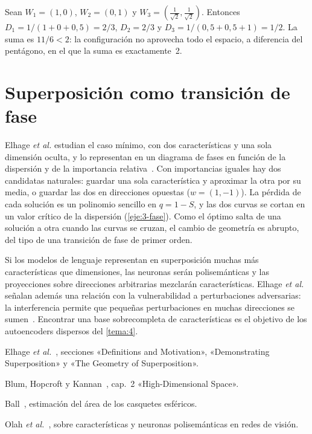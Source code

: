 \begin{ejemplo}\label{ej:tres}
Sean $W_1=(1,0)$, $W_2=(0,1)$ y $W_3=(\tfrac{1}{\sqrt2},\tfrac{1}{\sqrt2})$. Entonces $D_1=1/(1+0+0{,}5)=2/3$, $D_2=2/3$ y $D_3=1/(0{,}5+0{,}5+1)=1/2$. La suma es $11/6<2$: la configuración no aprovecha todo el espacio, a diferencia del pentágono, en el que la suma es exactamente~2.
\end{ejemplo}

\section{Superposición como transición de fase}

Elhage \emph{et al.} estudian el caso mínimo, con dos características y una sola dimensión oculta, y lo representan en un diagrama de fases en función de la dispersión y de la importancia relativa~\cite[«Superposition as a Phase Change»]{elhage22}. Con importancias iguales hay dos candidatas naturales: guardar una sola característica y aproximar la otra por su media, o guardar las dos en direcciones opuestas ($w=(1,-1)$). La pérdida de cada solución es un polinomio sencillo en $q=1-S$, y las dos curvas se cortan en un valor crítico de la dispersión (\cref{eje:3-fase}). Como el óptimo salta de una solución a otra cuando las curvas se cruzan, el cambio de geometría es abrupto, del tipo de una transición de fase de primer orden.

\begin{observacion}\label{obs:superposicion-llm}
Si los modelos de lenguaje representan en superposición muchas más características que dimensiones, las neuronas serán polisemánticas y las proyecciones sobre direcciones arbitrarias mezclarán características. Elhage \emph{et al.} señalan además una relación con la vulnerabilidad a perturbaciones adversarias: la interferencia permite que pequeñas perturbaciones en muchas direcciones se sumen~\cite[«Relationship to Adversarial Robustness»]{elhage22}. Encontrar una base sobrecompleta de características es el objetivo de los autoencoders dispersos del \cref{tema:4}.
\end{observacion}

\begin{lecturas}
\item Elhage \emph{et al.}~\cite{elhage22}, secciones «Definitions and Motivation», «Demonstrating Superposition» y «The Geometry of Superposition».
\item Blum, Hopcroft y Kannan~\cite{bhk}, cap.~2 «High-Dimensional Space».
\item Ball~\cite{ball}, estimación del área de los casquetes esféricos.
\item Olah \emph{et al.}~\cite{olah-zoom}, sobre características y neuronas polisemánticas en redes de visión.
\end{lecturas}

